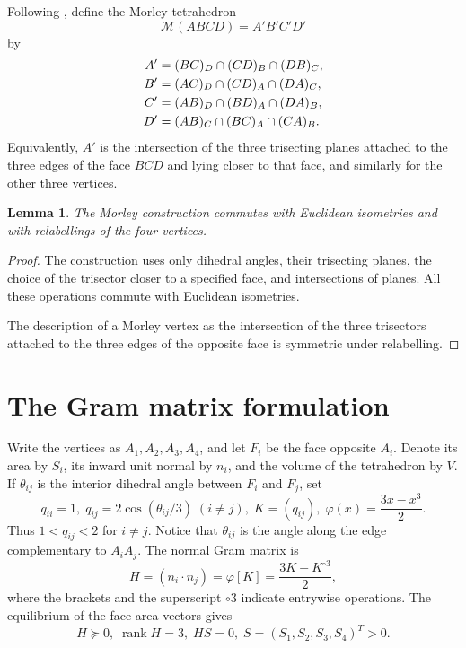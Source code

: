 \documentclass[11pt]{article}
\newtheorem{lemma}[theorem]{Lemma}
\theoremstyle{definition}
\theoremstyle{remark}
\DeclareMathOperator{\rank}{rank}
\newcommand{\M}{\mathcal M}
\newcommand{\ph}{\varphi}
\begin{document}
Following \cite{TranActa}, define the Morley tetrahedron
\[
\M(ABCD)=A'B'C'D'
\]
by
\begin{align}
A'&=(BC)_D\cap(CD)_B\cap(DB)_C, \notag\\
B'&=(AC)_D\cap(CD)_A\cap(DA)_C, \notag\\
C'&=(AB)_D\cap(BD)_A\cap(DA)_B, \notag\\
D'&=(AB)_C\cap(BC)_A\cap(CA)_B. \label{eq:morleydefinition}
\end{align}
Equivalently, $A'$ is the intersection of the three trisecting planes attached to the three edges of the face $BCD$ and lying closer to that face, and similarly for the other three vertices.

\begin{lemma}
\label{lem:equivariance} The Morley construction commutes with Euclidean isometries and with relabellings of the four vertices.
\end{lemma}

\begin{proof}
The construction uses only dihedral angles, their trisecting planes, the choice of the trisector closer to a specified face, and intersections of planes. All these operations commute with Euclidean isometries.

The description of a Morley vertex as the intersection of the three trisectors attached to the three edges of the opposite face is symmetric under relabelling.
\end{proof}

\section{The Gram matrix formulation}
\label{sec:gram}

Write the vertices as $A_1,A_2,A_3,A_4$, and let $F_i$ be the face opposite $A_i$. Denote its area by $S_i$, its inward unit normal by $n_i$, and the volume of the tetrahedron by $V$. If $\theta_{ij}$ is the interior dihedral angle between $F_i$ and $F_j$, set
\[
q_{ii}=1,\; q_{ij}=2\cos(\theta_{ij}/3)\;(i\ne j),
\; K=(q_{ij}),\; \ph(x)=\frac{3x-x^3}{2}.
\]
Thus $1<q_{ij}<2$ for $i\ne j$. Notice that $\theta_{ij}$ is the angle along the edge complementary to $A_iA_j$. The normal Gram matrix is
\begin{equation}
H=(n_i\cdot n_j)=\ph[K]=\frac{3K-K^{\circ3}}2,
\label{eq:normalgram}
\end{equation}
where the brackets and the superscript $\circ3$ indicate entrywise operations. The equilibrium of the face area vectors gives
\begin{equation}
H\succeq0,\; \rank H=3,\; HS=0,
\; S=(S_1,S_2,S_3,S_4)^T>0.
\label{eq:positivekernel}
\end{equation}
\end{document}
